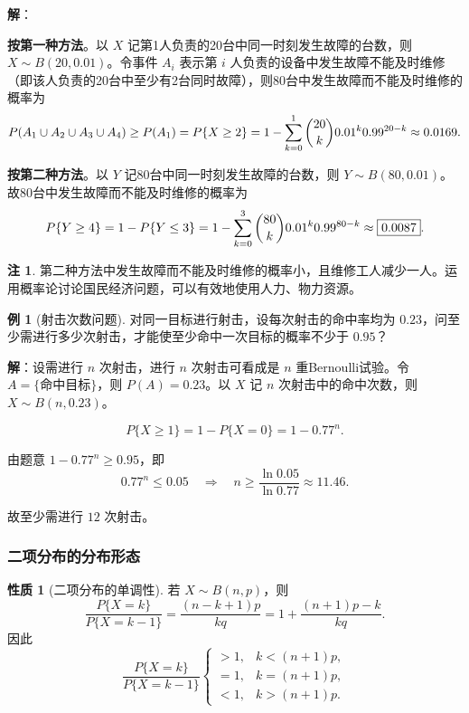 \documentclass[11pt,a4paper]{report}
\theoremstyle{definition}
\newtheorem{example}{例}[chapter]
\newtheorem{note}{注}[chapter]
\newtheorem{property}{性质}[chapter]
\begin{document}
\textbf{解}：

\textbf{按第一种方法}。以 $X$ 记第1人负责的20台中同一时刻发生故障的台数，则 $X \sim B(20,0.01)$。令事件 $A_i$ 表示第 $i$ 人负责的设备中发生故障不能及时维修（即该人负责的20台中至少有2台同时故障），则80台中发生故障而不能及时维修的概率为
\[
P(A_1 \cup A_2 \cup A_3 \cup A_4) \geq P(A_1) = P\{X \geq 2\} = 1 - \sum_{k=0}^{1}\dbinom{20}{k}0.01^k 0.99^{20-k} \approx 0.0169.
\]

\textbf{按第二种方法}。以 $Y$ 记80台中同一时刻发生故障的台数，则 $Y \sim B(80,0.01)$。故80台中发生故障而不能及时维修的概率为
\[
P\{Y \geq 4\} = 1 - P\{Y \leq 3\} = 1 - \sum_{k=0}^{3}\dbinom{80}{k}0.01^k 0.99^{80-k} \approx \boxed{0.0087}.
\]

\begin{note}
第二种方法中发生故障而不能及时维修的概率小，且维修工人减少一人。运用概率论讨论国民经济问题，可以有效地使用人力、物力资源。
\end{note}

\begin{example}[射击次数问题]
对同一目标进行射击，设每次射击的命中率均为 $0.23$，问至少需进行多少次射击，才能使至少命中一次目标的概率不少于 $0.95$？
\end{example}

\textbf{解}：设需进行 $n$ 次射击，进行 $n$ 次射击可看成是 $n$ 重Bernoulli试验。令 $A=\{\text{命中目标}\}$，则 $P(A)=0.23$。以 $X$ 记 $n$ 次射击中的命中次数，则 $X \sim B(n,0.23)$。

\[
P\{X \geq 1\} = 1 - P\{X=0\} = 1 - 0.77^n.
\]

由题意 $1 - 0.77^n \geq 0.95$，即
\[
0.77^n \leq 0.05 \quad\Longrightarrow\quad n \geq \frac{\ln 0.05}{\ln 0.77} \approx 11.46.
\]

故至少需进行 $\boxed{12}$ 次射击。

\subsubsection{二项分布的分布形态}

\begin{property}[二项分布的单调性]
若 $X \sim B(n,p)$，则
\[
\frac{P\{X=k\}}{P\{X=k-1\}} = \frac{(n-k+1)p}{kq} = 1 + \frac{(n+1)p - k}{kq}.
\]
因此
\[
\frac{P\{X=k\}}{P\{X=k-1\}} \begin{cases} >1, & k<(n+1)p, \\ =1, & k=(n+1)p, \\ <1, & k>(n+1)p. \end{cases}
\]
\end{property}
\end{document}
